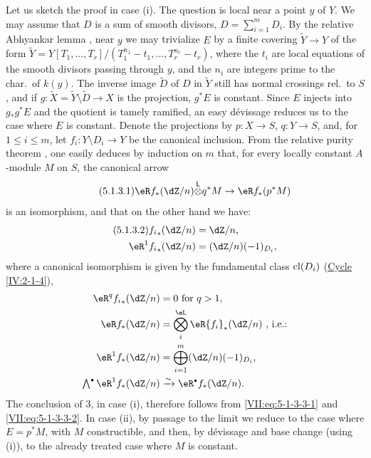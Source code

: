Let us sketch the proof in case (i). The question is local near a point $y$
of $Y$. We may assume that $D$ is a sum of smooth divisors,
$D=\sum_{i=1}^m D_i$. By the relative Abhyankar lemma
\cite[XIII 5.5]{sga1}, near $y$ we may trivialize $E$ by a finite covering
$\widetilde Y\to Y$ of the form
$\widetilde Y=Y[T_1,\dots,T_r]/(T_1^{n_1}-t_1,\dots,T_r^{n_r}-t_r)$, where the
$t_i$ are local equations of the smooth divisors passing through $y$, and the
$n_i$ are integers prime to the char.\ of $k(y)$. The inverse image
$\widetilde D$ of $D$ in $\widetilde Y$ still has normal crossings rel.\ to $S$, and
if $g:\widetilde X=\widetilde Y\setminus \widetilde D\to X$ is the projection,
$g^\ast E$ is constant. Since $E$ injects into $g_\ast g^\ast E$ and the
quotient is tamely ramified, an easy dévissage reduces us to the case where
$E$ is constant. Denote the projections by $p:X\to S$, $q:Y\to S$, and, for
$1\leqslant i\leqslant m$, let $f_i:Y\setminus D_i \to Y$ be the canonical
inclusion. From the relative purity theorem \cite[XVI 3.7]{sga4}, one easily
deduces by induction on $m$ that, for every locally constant $A$-module $M$ on
$S$, the canonical arrow
\begin{equation*}\tag{5.1.3.1}\label{VII:eq:5-1-3-3-1} %
  \eR f_\ast (\dZ/n)\lotimes q^\ast M\to \eR f_\ast (p^\ast M) 
\end{equation*}
is an isomorphism, and that on the other hand we have:
\begin{align*}\tag{5.1.3.2}\label{VII:eq:5-1-3-3-2}
  {f_i}_\ast(\dZ/n) &= \dZ/n \text{,} \\
  \eR^1 {f_i}_\ast (\dZ/n) &= (\dZ/n)(-1)_{D_i} \text{,} 
\end{align*}
where a canonical isomorphism is given by the fundamental class $\operatorname{cl}(D_i)$
(\hyperref[IV]{Cycle} \ref{IV:2-1-4}),
\begin{align*}
  \eR^q {f_i}_\ast(\dZ/n) &= 0\text{ for $q>1$,} \\
  \eR f_\ast (\dZ/n) &= \bigotimes_i^\eL \eR {f_i}_\ast (\dZ/n) \text{ , i.e.:} \\
  \eR^1 f_\ast(\dZ/n) &= \bigoplus_{i=1}^m (\dZ/n)(-1)_{D_i} \text{,} \\
  \textstyle\bigwedge^\bullet \eR^1 f_\ast(\dZ/n) &\iso \eR^\bullet f_\ast (\dZ/n) \text{.} 
\end{align*}
The conclusion of 3, in case (i), therefore follows from
\eqref{VII:eq:5-1-3-3-1} and \eqref{VII:eq:5-1-3-3-2}. In case (ii), by
passage to the limit we reduce to the case where $E=p^\ast M$, with $M$
constructible, and then, by dévissage and base change (using (i)), to the
already treated case where $M$ is constant.


